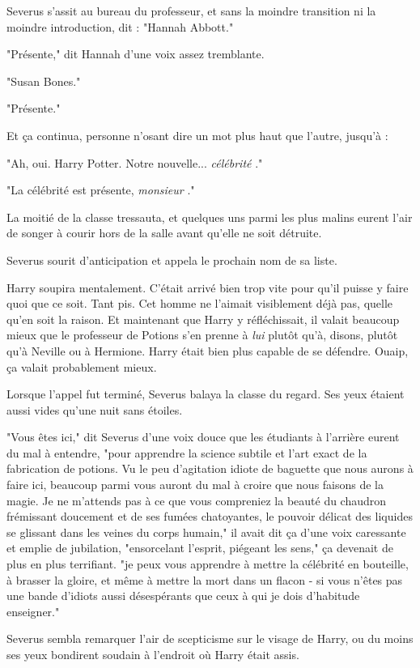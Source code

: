 Severus s'assit au bureau du professeur, et sans la moindre transition ni la moindre introduction, dit : "Hannah Abbott."

"Présente," dit Hannah d'une voix assez tremblante.

"Susan Bones."

"Présente."

Et ça continua, personne n'osant dire un mot plus haut que l'autre, jusqu'à :

"Ah, oui. Harry Potter. Notre nouvelle... \emph{célébrité} ."

"La célébrité est présente, \emph{monsieur} ."

La moitié de la classe tressauta, et quelques uns parmi les plus malins eurent l'air de songer à courir hors de la salle avant qu'elle ne soit détruite.

Severus sourit d'anticipation et appela le prochain nom de sa liste.

Harry soupira mentalement. C'était arrivé bien trop vite pour qu'il puisse y faire quoi que ce soit. Tant pis. Cet homme ne l'aimait visiblement déjà pas, quelle qu'en soit la raison. Et maintenant que Harry y réfléchissait, il valait beaucoup mieux que le professeur de Potions s'en prenne à \emph{lui } plutôt qu'à, disons, plutôt qu'à Neville ou à Hermione. Harry était bien plus capable de se défendre. Ouaip, ça valait probablement mieux.

Lorsque l'appel fut terminé, Severus balaya la classe du regard. Ses yeux étaient aussi vides qu'une nuit sans étoiles.

"Vous êtes ici," dit Severus d'une voix douce que les étudiants à l'arrière eurent du mal à entendre, "pour apprendre la science subtile et l'art exact de la fabrication de potions. Vu le peu d'agitation idiote de baguette que nous aurons à faire ici, beaucoup parmi vous auront du mal à croire que nous faisons de la magie. Je ne m'attends pas à ce que vous compreniez la beauté du chaudron frémissant doucement et de ses fumées chatoyantes, le pouvoir délicat des liquides se glissant dans les veines du corps humain," il avait dit ça d'une voix caressante et emplie de jubilation, "ensorcelant l'esprit, piégeant les sens," ça devenait de plus en plus terrifiant. "je peux vous apprendre à mettre la célébrité en bouteille, à brasser la gloire, et même à mettre la mort dans un flacon - si vous n'êtes pas une bande d'idiots aussi désespérants que ceux à qui je dois d'habitude enseigner."

Severus sembla remarquer l'air de scepticisme sur le visage de Harry, ou du moins ses yeux bondirent soudain à l'endroit où Harry était assis.

